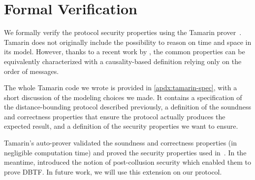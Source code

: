 \section{Formal Verification}

We formally verify the protocol security properties using the Tamarin
prover~\cite{meier2013tamarin}. Tamarin does not originally include
the possibility to reason on time and space in its model.  However,
thanks to a recent work by \textcite{TamarinDB}, the common properties
can be equivalently characterized with a causality-based definition
relying only on the order of messages.

The whole Tamarin code we wrote is provided in \cref{apdx:tamarin-spec}, with a short discussion of the modeling choices we made. 
It contains a specification of the distance-bounding protocol described previously, a definition of the soundness and correctness properties that ensure the protocol actually produces the expected result, and a definition of the security properties we want to ensure.

Tamarin's auto-prover validated the soundness and correctness
properties (in negligible computation time) and proved the security
properties used in~\cite{TamarinDB}. In the meantime,
\textcite{TamarinDBTF} introduced the notion of post-collusion
security which enabled them to prove \ac{DBTF}. In future work, we
will use this extension on our protocol.



